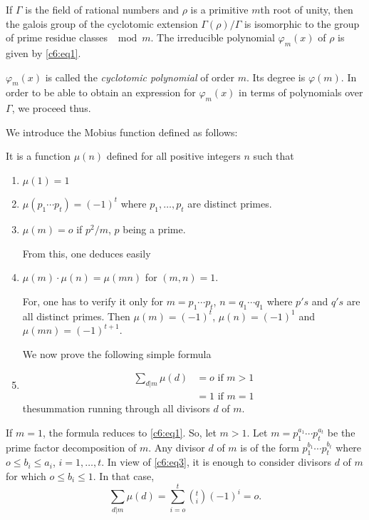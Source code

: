 \begin{thm}\label{c6:thm3}%
 If $\Gamma$  is the field of rational numbers and $\rho$
  is a primitive $m$th root of unity, then the galois  group of the
  cyclotomic extension $\Gamma(\rho)/ \Gamma$ is isomorphic to the
  group of prime  residue classes $ \mod m$.  The irreducible
  polynomial  $\varphi_m (x)$ of  $\rho$ is given by \eqref{c6:eq1}.  
\end{thm}

$\varphi_m(x)$ is called the \textit{cyclotomic polynomial} of order
$m$. Its degree is $\varphi(m)$. In order to be able to obtain an
expression  for $\varphi_m(x)$ in terms of polynomials over $\Gamma$,
we proceed thus.  

We introduce the Mobius function defined as follows: 

It is a function $\mu(n)$ defined for all positive integers $n$ such
that  
\begin{enumerate}[1)]
\item $\mu(1)=1$

\item $\mu(p_1 \cdots p_t) =(-1)^t$ where $p_1, \ldots , p_t$ are
  distinct primes. 

\item $\mu (m) =o$ if $p^2/m$, $p$ being a prime.

From  this, one deduces easily

\item $\mu(m)\cdot \mu  (n)= \mu (mn)$ for $(m,n)=1$. 

For, one has to verify it only for $m =p_1 \cdots p_t$, $n= q_1 \cdots
q_1$ where $p's$ and $q's$ are all distinct primes. Then $\mu (m) =
(-1)^t$, $\mu (n) =(-1)^1$ and $\mu (mn) =(-1)^{t+1}$.  

We now prove the following  simple formula
\item  
\begin{align*}
\sum_{d|m} \mu (d) & = o \text{ if }  m>1 \\
& = 1 \text{ if } m = 1 
\end{align*}
the\pageoriginale summation running through all divisors $d$ of $m$. 
\end{enumerate}

If $m=1$, the formula reduces to \eqref{c6:eq1}. So, let $ m >1$. Let $m =
p^{a_1}_1 \cdots p^{a_t}_t$ be the prime factor decomposition of 
$m$. Any divisor $d$ of $m$ is of the form $p_1^{b_1} \cdots
p_t^{b_t}$ where $o \le b_i \le a_i$, $i=1,\ldots,t$. In view of
\eqref{c6:eq3}, it is enough to consider divisors $d$ of $m$ for which $o \le
b_i \le 1$. In that case,  
$$
\sum_{d|m} \mu (d) = \sum_{i=o}^t (^t_i) (-1)^i = o. 
$$

